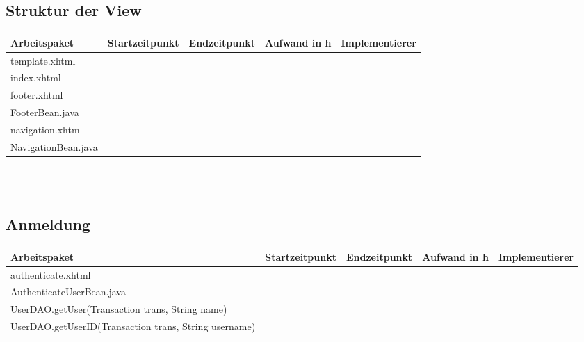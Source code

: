 \begin{landscape}
\subsection{Struktur der View}
\begin{tabular}{|p{10cm}|p{4cm}|p{3cm}|p{3cm}|p{3cm}|}
	\hline  \textbf{Arbeitspaket} & \textbf{Startzeitpunkt} & \textbf{Endzeitpunkt} & \textbf{Aufwand in h} & \textbf{Implementierer} \\ 
	\hline   template.xhtml                   &                            &                             &                     &\\
	\hline   index.xhtml                      &                            &                             &                     &\\
	\hline   footer.xhtml                     &                            &                             &                     &\\ 
	\hline   FooterBean.java                  &                            &                             &                     &\\ 
	\hline   navigation.xhtml                 &                            &                             &                     &\\ 
	\hline   NavigationBean.java              &                            &                             &                     &\\ 
	\hline 
\end{tabular} \ \\
\ \\

\subsection{Anmeldung}
\begin{tabular}{|p{10cm}|p{4cm}|p{3cm}|p{3cm}|p{3cm}|}
	\hline  \textbf{Arbeitspaket} & \textbf{Startzeitpunkt} & \textbf{Endzeitpunkt} & \textbf{Aufwand in h} & \textbf{Implementierer} \\ 
	\hline   authenticate.xhtml                                   &                            &                             &                     &\\
	\hline   AuthenticateUserBean.java                            &                            &                             &                     &\\ 
	\hline   UserDAO.getUser(Transaction trans, String name)      &                            &                             &                     &\\ 
	\hline   UserDAO.getUserID(Transaction trans, String username)&                            &                             &                     &\\ 
	\hline 
\end{tabular} \ \\
\ \\


\end{landscape}

